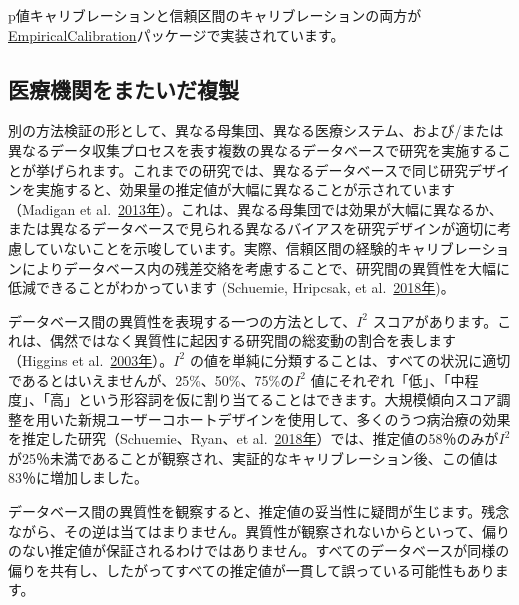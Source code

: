 \documentclass[
  11pt]{book}
\makeatletter
\newenvironment{kframe}{%
\medskip{}
\setlength{\fboxsep}{.8em}
 \def\at@end@of@kframe{}%
 \ifinner\ifhmode%
  \def\at@end@of@kframe{\end{minipage}}%
  \begin{minipage}{\columnwidth}%
 \fi\fi%
 \def\FrameCommand##1{\hskip\@totalleftmargin \hskip-\fboxsep
 \colorbox{myShadeColor}{##1}\hskip-\fboxsep
     \hskip-\linewidth \hskip-\@totalleftmargin \hskip\columnwidth}%
 \MakeFramed {\advance\hsize-\width
   \@totalleftmargin\z@ \linewidth\hsize
   \@setminipage}}%
 {\par\unskip\endMakeFramed%
 \at@end@of@kframe}
\newenvironment{rmdblock}[1]
  {
  \begin{itemize}
  \renewcommand{\labelitemi}{
    \raisebox{-.7\height}[0pt][0pt]{
      {\setkeys{Gin}{width=3em,keepaspectratio}\texttt{[image: images/\#1]}}
    }
  }
  \setlength{\fboxsep}{1em}
  \begin{kframe}
  \item
  }
  {
  \end{kframe}
  \end{itemize}
  }
\newenvironment{rmdimportant}
  {\begin{rmdblock}{important}}
  {\end{rmdblock}}
\theoremstyle{definition}
\theoremstyle{definition}
\theoremstyle{definition}
\theoremstyle{definition}
\theoremstyle{remark}
\makeatother
\begin{document}
p値キャリブレーションと信頼区間のキャリブレーションの両方が\href{https://ohdsi.github.io/EmpiricalCalibration/}{EmpiricalCalibration}パッケージで実装されています。

\subsection{医療機関をまたいだ複製}\label{ux533bux7642ux6a5fux95a2ux3092ux307eux305fux3044ux3060ux8907ux88fd}


別の方法検証の形として、異なる母集団、異なる医療システム、および/または異なるデータ収集プロセスを表す複数の異なるデータベースで研究を実施することが挙げられます。これまでの研究では、異なるデータベースで同じ研究デザインを実施すると、効果量の推定値が大幅に異なることが示されています（Madigan et al.~\href{https://ohdsi.github.io/TheBookOfOhdsi/MethodValidity.html\#ref-madigan_2013}{2013年}）。これは、異なる母集団では効果が大幅に異なるか、または異なるデータベースで見られる異なるバイアスを研究デザインが適切に考慮していないことを示唆しています。実際、信頼区間の経験的キャリブレーションによりデータベース内の残差交絡を考慮することで、研究間の異質性を大幅に低減できることがわかっています (Schuemie, Hripcsak, et al.~\href{https://ohdsi.github.io/TheBookOfOhdsi/MethodValidity.html\#ref-schuemie_2018}{2018年})。

データベース間の異質性を表現する一つの方法として、\(I^2\) スコアがあります。これは、偶然ではなく異質性に起因する研究間の総変動の割合を表します（Higgins et al.~\href{https://ohdsi.github.io/TheBookOfOhdsi/MethodValidity.html\#ref-higgins_2003}{2003年}）。\(I^2\) の値を単純に分類することは、すべての状況に適切であるとはいえませんが、25\%、50\%、75\%の\(I^2\) 値にそれぞれ「低」、「中程度」、「高」という形容詞を仮に割り当てることはできます。大規模傾向スコア調整を用いた新規ユーザーコホートデザインを使用して、多くのうつ病治療の効果を推定した研究（Schuemie、Ryan、et al.~\href{https://ohdsi.github.io/TheBookOfOhdsi/MethodValidity.html\#ref-schuemie_2018b}{2018年}）では、推定値の58％のみが\(I^2\) が25％未満であることが観察され、実証的なキャリブレーション後、この値は83％に増加しました。

\begin{rmdimportant}
データベース間の異質性を観察すると、推定値の妥当性に疑問が生じます。残念ながら、その逆は当てはまりません。異質性が観察されないからといって、偏りのない推定値が保証されるわけではありません。すべてのデータベースが同様の偏りを共有し、したがってすべての推定値が一貫して誤っている可能性もあります。
\end{rmdimportant}
\end{document}
